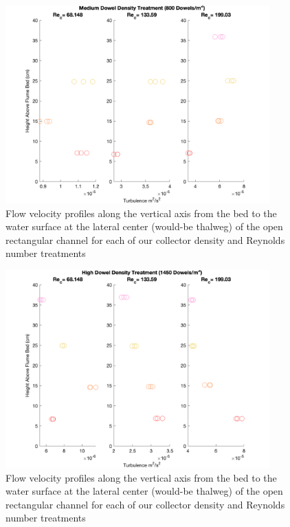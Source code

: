 \documentclass{article}
\begin{document}
\begin{figure}[H]
\includegraphics[width=4in]{pics/turb_mid.png}
\centering
\caption{Flow velocity profiles along the vertical axis from the bed to the water surface at the lateral center (would-be thalweg) of the open rectangular channel for each of our collector density and Reynolds number treatments}
\label{fig:t3}
\end{figure}

\begin{figure}[H]
\includegraphics[width=4in]{pics/turb_hi.png}
\centering
\caption{Flow velocity profiles along the vertical axis from the bed to the water surface at the lateral center (would-be thalweg) of the open rectangular channel for each of our collector density and Reynolds number treatments}
\label{fig:t4}
\end{figure}
\end{document}
